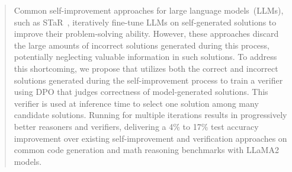 \documentclass{article}
\theoremstyle{plain}
\theoremstyle{definition}
\theoremstyle{remark}
\begin{document}

\printAffiliationsAndNotice{} %

\begin{abstract}

Common self-improvement approaches for large language models~(LLMs), such as STaR~\citep{DBLP:conf/nips/ZelikmanWMG22}, iteratively fine-tune  LLMs on self-generated solutions to improve their problem-solving ability. However, these approaches discard the large amounts of incorrect solutions generated during this process, potentially neglecting valuable information in such solutions. To address this shortcoming, we propose \vstar{} that utilizes both the correct and incorrect solutions generated during the self-improvement process to train a verifier using DPO that judges correctness of model-generated solutions. This verifier is used at inference time to select one solution among many candidate solutions. Running \vstar{} for multiple iterations results in progressively better reasoners and verifiers, delivering a 4\% to 17\% test accuracy improvement over existing self-improvement and verification approaches on common code generation and math reasoning benchmarks with LLaMA2 models.
\end{abstract}




















\end{document}
